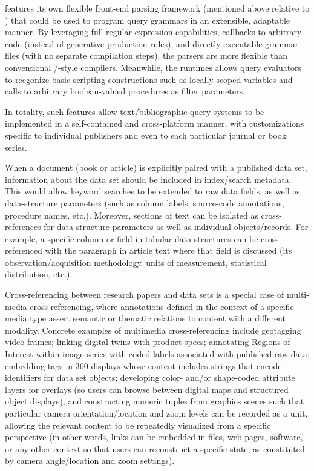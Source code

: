 \documentclass[11pt]{article}
\begin{document}
{{\begin{description}
\pseudoIndent{} \lPacTk{} features its own flexible front-end parsing 
framework (mentioned above relative to \GTagML{}) that 
could be used to program query grammars in an extensible, 
adaptable manner.  By leveraging full regular expression 
capabilities, callbacks to arbitrary code (instead of 
generative production rules), and directly-executable 
grammar files (with no separate compilation steps), 
the \PacTk{} parsers are more flexible than conventional 
\LEX{}/\YACC{}-style compilers.  Meanwhile, the \VM{} 
runtimes allows query evaluators to recgonize basic 
scripting constructions such as locally-scoped variables 
and calls to arbitrary boolean-valued procedures as 
filter parameters.

\pseudoIndent{} In totality, such features allow 
text/bibliographic query systems to be implemented 
in a self-contained and cross-platform manner, 
with customizations specific to individual publishers 
and even to each particular journal or book series.  

\item[Multimedia Cross-Referencing]  When a document (book or article) is explicitly paired with a 
published data set, information about the data set should be 
included in index/search metadata.  This would allow 
keyword searches to be extended to raw data fields, as well 
as data-structure parameters (such as column labels, source-code 
annotations, procedure names, etc.).  Moreover, sections of text 
can be isolated as cross-references for data-structure parameters 
as well as individual objects/records.  For example, a specific 
column or field in tabular data structures can be cross-referenced 
with the paragraph in article text where that field is 
discussed (its observation/acquisition methodology, units of measurement, 
statistical distribution, etc.).

\pseudoIndent{} Cross-referencing between research papers and data sets 
is a special case of multi-media cross-referencing, where annotations defined 
in the context of a specific media type assert semantic or thematic 
relations to content with a different modality.  Concrete examples 
of multimedia cross-referencing include geotagging video frames; linking 
\CAD{} digital twins with product specs; annotating Regions of Interest 
within image series with coded labels associated with published raw data; 
embedding tags in 360\textdegree{} displays whose content includes 
\URL{} strings that encode identifiers for data set objects; developing 
color- and/or shape-coded attribute layers for \GIS{} overlays (so users 
can browse between digital maps and structured object 
displays); and constructing numeric tuples from \ThreeD{} graphics scenes 
such that particular camera orientation/location and zoom levels 
can be recorded as a unit, allowing the relevant \ThreeD{} content to be 
repeatedly visualized from a specific perspective (in other words, 
links can be embedded in \PDF{} files, web pages, software, or any 
other context so that users can reconstruct a specific \ThreeD{} state, 
as constituted by camera angle/location and zoom settings).


\end{description}}}
\end{document}
